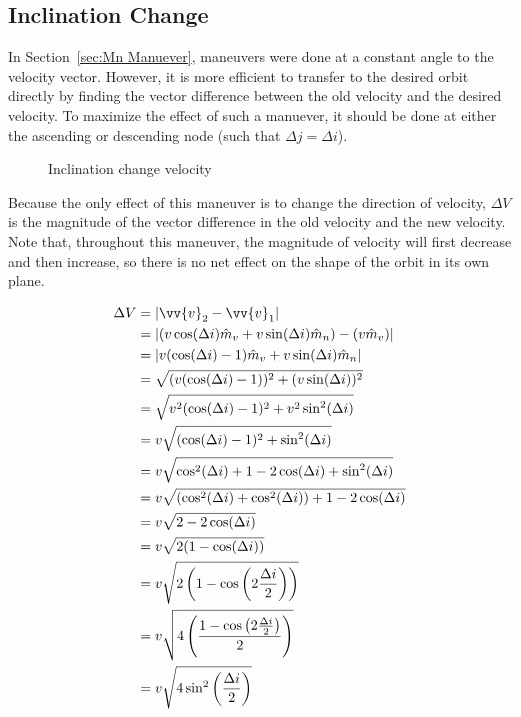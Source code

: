 \documentclass[../basicOrbitalDynamics.tex]{subfiles}
\begin{document}
\bigskip\bigskip
\subsection{Inclination Change}

In Section~\ref{sec:Mn Manuever}, maneuvers were done at a constant angle to the velocity vector. However, it is more efficient to transfer to the desired orbit directly by finding the vector difference between the old velocity and the desired velocity. To maximize the effect of such a manuever, it should be done at either the ascending or descending node (such that $\Delta j=\Delta i$).

\begin{figure}[H]
    \centering
    \caption{Inclination change velocity}\label{fig:dV Triangle Inclination Chage}
\end{figure}

Because the only effect of this maneuver is to change the direction of velocity, $\Delta V$ is the magnitude of the vector difference in the old velocity and the new velocity. Note that, throughout this maneuver, the magnitude of velocity will first decrease and then increase, so there is no net effect on the shape of the orbit in its own plane.

\begin{align*}
    \Delta V &= |\vv{v}_2-\vv{v}_1| \\
    &= |(v\cos(\Delta i)\hat{m}_v+v\sin(\Delta i)\hat{m}_n)-(v\hat{m}_v)| \\
    &= |v(\cos(\Delta i)-1)\hat{m}_v+v\sin(\Delta i)\hat{m}_n| \\
    &= \sqrt{(v(\cos(\Delta i)-1))^2+(v\sin(\Delta i))^2} \\
    &= \sqrt{v^2(\cos(\Delta i)-1)^2+v^2\sin^2(\Delta i)} \\
    &= v\sqrt{(\cos(\Delta i)-1)^2+\sin^2(\Delta i)} \\
    &= v\sqrt{\cos^2(\Delta i)+1-2\cos(\Delta i)+\sin^2(\Delta i)} \\
    &= v\sqrt{(\cos^2(\Delta i)+\cos^2(\Delta i))+1-2\cos(\Delta i)} \\
    &= v\sqrt{2-2\cos(\Delta i)} \\
    &= v\sqrt{2(1-\cos(\Delta i))} \\
    &= v\sqrt{2\left(1-\cos\left(2\frac{\Delta i}{2}\right)\right)} \\
    &= v\sqrt{4\left(\frac{1-\cos\left(2\frac{\Delta i}{2}\right)}{2}\right)} \\
    &= v\sqrt{4\sin^2\left(\frac{\Delta i}{2}\right)} \\
\end{align*}
\end{document}
